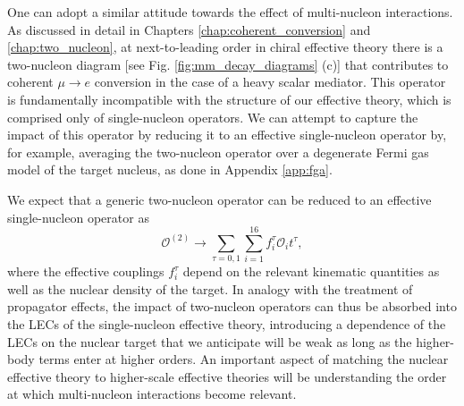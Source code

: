 \documentclass{book}[letterpaper,12pt]
\begin{document}
One can adopt a similar attitude towards the effect of multi-nucleon interactions. As discussed in detail in Chapters \ref{chap:coherent_conversion} and \ref{chap:two_nucleon}, at next-to-leading order in chiral effective theory there is a two-nucleon diagram [see Fig. \ref{fig:mm_decay_diagrams} (c)] that contributes to coherent $\mu\rightarrow e$ conversion in the case of a heavy scalar mediator. This operator is fundamentally incompatible with the structure of our effective theory, which is comprised only of single-nucleon operators. We can attempt to capture the impact of this operator by reducing it to an effective single-nucleon operator by, for example, averaging the two-nucleon operator over a degenerate Fermi gas model of the target nucleus, as done in Appendix \ref{app:fga}.

We expect that a generic two-nucleon operator can be reduced to an effective single-nucleon operator as
\begin{equation}
\mathcal{O}^{(2)}\rightarrow \sum_{\tau=0,1}\sum_{i=1}^{16}f_i^{\tau}\mathcal{O}_it^{\tau},
\end{equation}
where the effective couplings $f_i^{\tau}$ depend on the relevant kinematic quantities as well as the nuclear density of the target. In analogy with the treatment of propagator effects, the impact of two-nucleon operators can thus be absorbed into the LECs of the single-nucleon effective theory, introducing a dependence of the LECs on the nuclear target that we anticipate will be weak as long as the higher-body terms enter at higher orders. An important aspect of matching the nuclear effective theory to higher-scale effective theories will be understanding the order at which multi-nucleon interactions become relevant.
\end{document}
